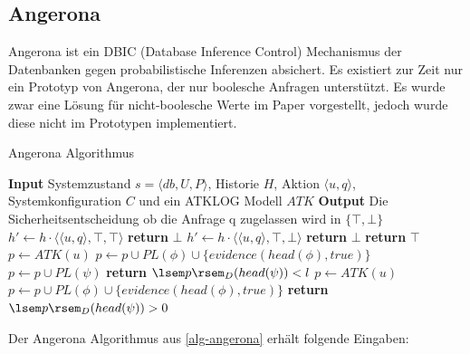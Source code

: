 \documentclass[german,version-2020-11]{uzl-thesis}
\begin{document}
\subsection{Angerona}

Angerona ist ein DBIC (Database Inference Control) Mechanismus\cite{22} der Datenbanken gegen probabilistische Inferenzen absichert. Es existiert zur Zeit nur ein Prototyp von Angerona, der nur boolesche Anfragen unterstützt. Es wurde zwar eine Lösung für nicht-boolesche Werte im Paper vorgestellt, jedoch wurde diese nicht im Prototypen implementiert.
\begin{algorithm}[ht]
	\caption{Angerona Algorithmus}\label{alg-angerona}
	\begin{algorithmic}[1]
		\State \textbf{Input} Systemzustand $s=\langle db,U,P\rangle $, Historie $H$, Aktion $\langle u,q \rangle$, Systemkonfiguration $C$ und ein ATKLOG Modell $ATK$
		\State \textbf{Output} Die Sicherheitsentscheidung ob die Anfrage q zugelassen wird in $\{ \top, \bot \}$
		 \State 
		$h'\gets h \cdot \langle \langle u,q\rangle , \top , \top \rangle$
		\State \textbf{return} $\bot$
		\EndIf
		\EndIf
		 \State 
		$h'\gets h \cdot \langle \langle u, q\rangle , \top , \bot \rangle$
		\State \textbf{return} $\bot$
		\EndIf
		\EndIf
		\EndIf
		\EndFor
		\State \textbf{return} $\top$
		\State
		\State $p\gets ATK(u)$
		\State $p\gets p \cup PL(\phi) \cup \{evidence(head(\phi),true)\}$ 
		\EndFor
		\State $p\gets p\cup PL(\psi)$
		\State \textbf{return} $\lsem p \rsem_D   (head(\psi)) < l $
		\EndFunction
		\State
		\State $p\gets ATK(u)$
		\State $p\gets p \cup PL(\phi) \cup \{evidence(head(\phi),true)\}$ 
		\EndFor
		\State \textbf{return} $\lsem p \rsem_D   (head(\psi)) > 0 $
		\EndFunction
	\end{algorithmic}
\end{algorithm}
Der Angerona Algorithmus aus \autoref{alg-angerona} erhält folgende Eingaben:
\end{document}

